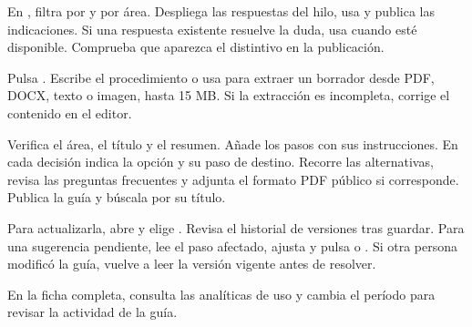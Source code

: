 En , filtra por  y por área. Despliega las respuestas del hilo, usa  y publica las indicaciones. Si una respuesta existente resuelve la duda, usa  cuando esté disponible. Comprueba que aparezca el distintivo  en la publicación.
\begin{pasos}
\item Pulsa . Escribe el procedimiento o usa  para extraer un borrador desde PDF, DOCX, texto o imagen, hasta 15 MB. Si la extracción es incompleta, corrige el contenido en el editor.
\item Verifica el área, el título y el resumen. Añade los pasos con sus instrucciones. En cada decisión indica la opción y su paso de destino. Recorre las alternativas, revisa las preguntas frecuentes y adjunta el formato PDF público si corresponde. Publica la guía y búscala por su título.
\item Para actualizarla, abre  y elige . Revisa el historial de versiones tras guardar. Para una sugerencia pendiente, lee el paso afectado, ajusta  y pulsa  o . Si otra persona modificó la guía, vuelve a leer la versión vigente antes de resolver.
\end{pasos}
\par En la ficha completa, consulta las analíticas de uso y cambia el período para revisar la actividad de la guía.


